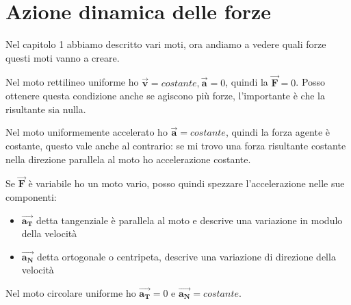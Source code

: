 \documentclass[class=book, crop=false, oneside, 12pt]{standalone}
\begin{document}
\section{Azione dinamica delle forze}

Nel capitolo 1 abbiamo descritto vari moti, ora andiamo a vedere quali forze questi moti vanno a creare.

Nel moto rettilineo uniforme ho \(\overrightarrow{\mathbf{v}} = costante, \overrightarrow{\mathbf{a}} = 0\), quindi la \(\overrightarrow{\mathbf{F}} = 0\).
Posso ottenere questa condizione anche se agiscono più forze, l'importante è che la risultante sia nulla.

Nel moto uniformemente accelerato ho \(\overrightarrow{\mathbf{a}} = costante\), quindi la forza agente è costante, 
questo vale anche al contrario: se mi trovo una forza risultante costante nella direzione parallela al moto ho accelerazione costante.

Se \(\overrightarrow{\mathbf{F}}\) è variabile ho un moto vario, posso quindi spezzare l'accelerazione nelle sue componenti:
\begin{itemize}
    \item \(\overrightarrow{\mathbf{a_T}}\) detta tangenziale è parallela al moto e descrive una variazione in modulo della velocità
    \item \(\overrightarrow{\mathbf{a_N}}\) detta ortogonale o centripeta, descrive una variazione di direzione della velocità
\end{itemize}

Nel moto circolare uniforme ho \(\overrightarrow{\mathbf{a_T}} = 0\) e \(\overrightarrow{\mathbf{a_N}} = costante\).
\end{document}
